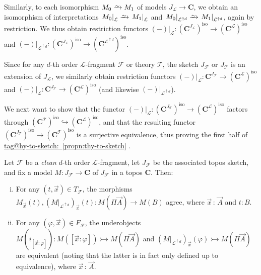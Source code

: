 \documentclass{amsart}
\makeatletter
\newcommand\bC{\mathbf{C}}
\newcommand\cF{\mathcal{F}}
\newcommand\cL{\mathcal{L}}
\newcommand\cT{\mathcal{T}}
\newcommand\hto{\hookrightarrow}
\newcommand\iso{\mathrm{iso}}
\renewcommand\phi{\varphi}
\newcommand\rstr[2]{{\left.#1\right|_{#2}}}
\newcommand\toi{\xrightarrow{\raisebox{-2.5pt}[0pt][0pt]{\ensuremath{\scriptstyle{\sim}}}}}
\newcommand\tolon{{\,:\,}}
\newcommand\tto{\rightarrowtail}
\newcommand\up{\uparrow}
\newcommand\vA{\vek{A}}
\newcommand\vek[1]{{\vec{#1}}}
\newcommand\vx{\vek{x}}
\newcommand\tagword[1]{\csname tag@#1\endcsname}
\def\label@tag#1:#2\@nil{#1}
\newcommand\labeltag[1]{\label@tag#1:\@nil}
\newcommand\jref[1]{%
  \texorpdfstring%
    {\hyperref[#1]{\tagword{\labeltag{#1}}~\ref*{#1}}}%
    {\tagword{\labeltag{#1}}~\ref*{#1}}%
}
\theoremstyle{definition}
\theoremstyle{remark}
\theoremstyle{plainwithref}
\makeatother
\begin{document}
\begin{defn}
  Similarly, to each isomorphism \( M_0 \toi M_1 \) of models \( J_\cL \to \bC \), we obtain an isomorphism of interpretations \( \rstr{M_0}{\cL} \toi \rstr{M_1}{\cL} \) and \( \rstr{M_0}{\cL^{\up d}} \toi \rstr{M_1}{\cL^{\up d}} \), again by restriction.
  We thus obtain restriction functors \( \rstr{(-)}{\cL} \colon (\bC^{J_\cL})^\iso \to (\bC^\cL)^\iso \) and \( \rstr{(-)}{\cL^{\up d}} \colon (\bC^{J_\cL})^\iso \to (\bC^{\cL^{\up d}})^\iso \).

  Since for any \( d \)-th order \( \cL \)-fragment \( \cF \) or theory \( \cT \), the sketch \( J_\cF \) or \( J_\cT \) is an extension of \( J_\cL \), we similarly obtain restriction functors \( \rstr{(-)}{\cL} \colon \bC^{J_\cF} \to (\bC^\cL)^\iso \) and \( \rstr{(-)}{\cL} \colon \bC^{J_\cT} \to (\bC^\cL)^\iso \) (and likewise \( \rstr{(-)}{\cL^{\up d}} \)).
\end{defn}

We next want to show that the functor \( \rstr{(-)}{\cL} \colon (\bC^{J_{\cT}})^\iso \to (\bC^{\cL})^\iso \) factors through \( (\bC^\cT)^\iso \hto (\bC^\cL)^\iso \), and that the resulting functor \( (\bC^{J_{\cT}})^\iso \to (\bC^\cT)^\iso \) is a surjective equivalence, thus proving the first half of \jref{propn:thy-to-sketch}.

\begin{lem} \label{lem:sketch-model-no-surprises}
  Let \( \cF \) be a \emph{clean} \( d \)-th order \( \cL \)-fragment, let \( J_{\cF} \) be the associated topos sketch, and fix a model \( M \colon J_\cF \to \bC \) of \( J_\cF \) in a topos \( \bC \).
  Then:
  \begin{enumerate}[(i)]
  \item For any \( (t, \vx) \in T_\cF \), the morphisms \( M_\vx(t), (\rstr{M}{\cL^{\up d}})_{\vx}(t) \colon M(\Pi \vA) \to M(B) \) agree, where \( \vx \tolon \vA \) and \( t \colon B \).
  \item For any \( (\phi, \vx) \in F_\cF \), the underobjects \( M(i_{[\vx \colon \phi]}) \colon M([\vx \colon \phi]) \tto M(\Pi \vA) \) and \( (\rstr{M}{\cL^{\up d}})_{\vx}(\phi) \tto M(\Pi \vA) \) are equivalent (noting that the latter is in fact only defined up to equivalence), where \( \vx \tolon \vA \).
  \end{enumerate}
\end{lem}
\end{document}
